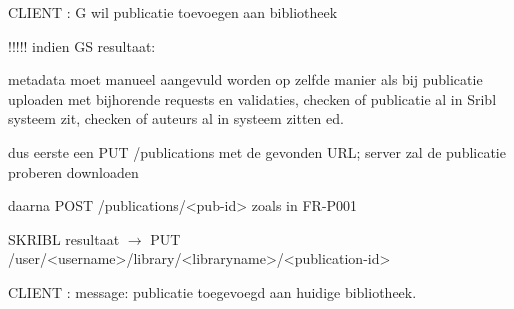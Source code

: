 \documentclass{article}
\begin{document}
\begin{description}
\item CLIENT :  G wil publicatie toevoegen aan bibliotheek
	\begin{description}
	\item !!!!!   indien GS resultaat: 
		\begin{description}
		\item metadata moet manueel aangevuld worden op zelfde manier als bij publicatie uploaden met bijhorende requests en validaties, checken of publicatie al in Sribl systeem zit, checken of auteurs al in systeem zitten ed. 
		\item dus eerste een PUT /publications met de gevonden URL; server zal de publicatie proberen downloaden 
		\item daarna POST /publications/<pub-id> zoals in FR-P001
		\end{description}
	\item SKRIBL resultaat $\rightarrow$ PUT /user/<username>/library/<libraryname>/<publication-id>
	\end{description}
			
\item CLIENT :  message: publicatie toegevoegd aan huidige bibliotheek.

 \end{description}
 
\end{document}
